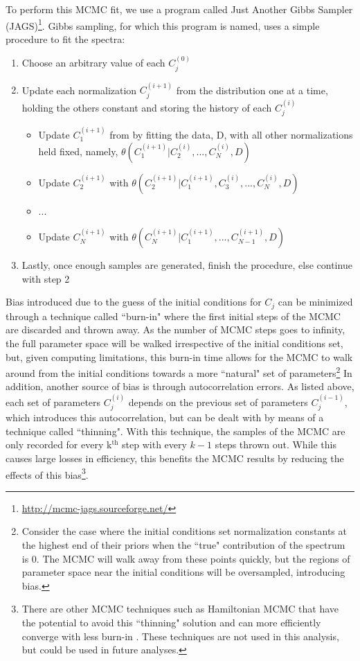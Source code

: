 To perform this MCMC fit, we use a program called Just Another Gibbs Sampler (JAGS)\footnote{\RaggedRight\url{http://mcmc-jags.sourceforge.net/}}.
Gibbs sampling, for which this program is named, uses a simple procedure to fit the spectra:
\begin{enumerate}
    \item Choose an arbitrary value of each $C_j^{(0)}$
    \item Update each normalization $C_j^{(i+1)}$ from the distribution one at a time, holding the others constant and storing the history of each $C_j^{(i)}$
    \begin{itemize}
        \item Update $C_1^{(i+1)}$ from by fitting the data, D, with all other normalizations held fixed, namely, $\theta(C_1^{(i+1)}|C_2^{(i)}, ..., C_N^{(i)}, D)$
        \item Update $C_2^{(i+1)}$ with $\theta(C_2^{(i+1)}|C_1^{(i+1)}, C_3^{(i)}, ..., C_N^{(i)}, D)$
        \item ...
        \item Update $C_N^{(i+1)}$ with $\theta(C_N^{(i+1)}|C_1^{(i+1)}, ..., C_{N-1}^{(i+1)}, D)$
    \end{itemize}
    \item Lastly, once enough samples are generated, finish the procedure, else continue with step 2
\end{enumerate}
Bias introduced due to the guess of the initial conditions for $C_j$ can be minimized through a technique called ``burn-in" where the first initial steps of the MCMC are discarded and thrown away.
As the number of MCMC steps goes to infinity, the full parameter space will be walked irrespective of the initial conditions set, but, given computing limitations, this burn-in time allows for the MCMC to walk around from the initial conditions towards a more ``natural" set of parameters\footnote{Consider the case where the initial conditions set normalization constants at the highest end of their priors when the ``true" contribution of the spectrum is 0.
The MCMC will walk away from these points quickly, but the regions of parameter space near the initial conditions will be oversampled, introducing bias.}
In addition, another source of bias is through autocorrelation errors.
As listed above, each set of parameters $C_j^{(i)}$ depends on the previous set of parameters $C_j^{(i-1)}$, which introduces this autocorrelation, but can be dealt with by means of a technique called ``thinning".
With this technique, the samples of the MCMC are only recorded for every k$^{\textrm{th}}$ step with every $k-1$ steps thrown out.
While this causes large losses in efficiency, this benefits the MCMC results by reducing the effects of this bias\footnote{There are other MCMC techniques such as Hamiltonian MCMC that have the potential to avoid this ``thinning" solution and can more efficiently converge with less burn-in \cite{2017arXiv170102434B}.
These techniques are not used in this analysis, but could be used in future analyses.}.

